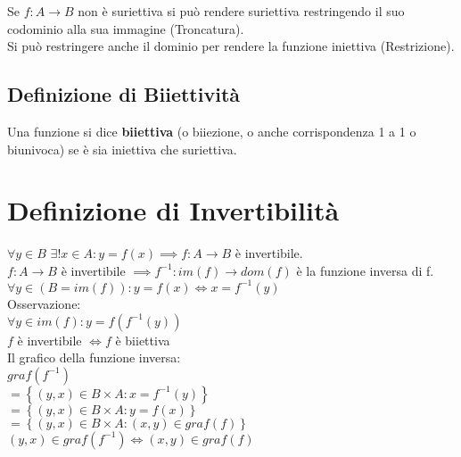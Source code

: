 \documentclass[a4paper, twoside, italian, 11pt]{book}
\newcommand{\braces}[1] {\left\{#1\right\}}
\begin{document}
\noindent
Se $f : A \rightarrow B$ non è suriettiva si può rendere suriettiva restringendo il suo codominio alla sua immagine (Troncatura). \\

\noindent
Si può restringere anche il dominio per rendere la funzione iniettiva (Restrizione). %


\subsection{Definizione di Biiettività}

Una funzione si dice \textbf{biiettiva} (o biiezione, o anche corrispondenza 1 a 1 o biunivoca) se è sia iniettiva che suriettiva.



\section{Definizione di Invertibilità}

\noindent
$\forall y \in B$ $\exists! x \in A : y = f(x) \implies f : A \rightarrow B$ è invertibile. \\

\noindent
$f : A \rightarrow B$ è invertibile $\implies f^{-1} : im(f) \rightarrow dom(f)$ è la funzione inversa di f. \\

\noindent
$\forall y \in (B = im(f)) : y = f(x) \iff x = f^{-1}(y)$ \\

\noindent
Osservazione: \\

\noindent
$\forall y \in im(f) : y = f(f^{-1}(y))$ \\

\noindent
$f$ è invertibile $\iff f$ è biiettiva \\

\noindent
Il grafico della funzione inversa: \\
$graf(f^{-1})$ \\
$= \braces{(y, x) \in B \times A : x = f^{-1}(y)}$ \\
$= \braces{(y, x) \in B \times A : y = f(x)}$ \\
$= \braces{(y, x) \in B \times A : (x, y) \in graf(f)}$ \\

\noindent
$(y, x) \in graf(f^{-1}) \iff (x, y) \in graf(f)$ \\
\end{document}
